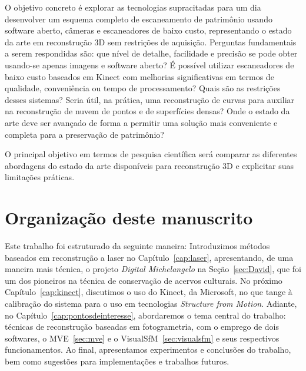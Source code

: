 O objetivo concreto é explorar as tecnologias supracitadas para
um dia desenvolver um esquema completo de escaneamento de patrimônio usando software aberto, câmeras e
escaneadores de baixo custo, representando o estado da arte em reconstrução 3D sem
restrições de aquisição. Perguntas fundamentais a serem respondidas são: que
nível de detalhe, facilidade e precisão se pode obter usando-se apenas imagens e software
aberto? É possível utilizar escaneadores de baixo custo baseados em Kinect com
melhorias significativas em termos de qualidade, conveniência ou tempo de
processamento?  Quais são as restrições desses sistemas? Seria útil, na prática,
uma reconstrução de curvas para auxiliar na reconstrução de nuvem de pontos e de
superfícies densas? Onde o estado da arte deve ser avançado de forma a permitir
uma solução mais conveniente e completa para a preservação de patrimônio?

O principal objetivo em termos de pesquisa científica será comparar as
diferentes abordagens do estado da arte disponíveis para reconstrução 3D e
explicitar suas limitações práticas.

\section{Organização deste manuscrito}

Este trabalho foi estruturado da seguinte maneira: Introduzimos
métodos baseados em reconstrução a laser no Capítulo~\ref{cap:laser},
apresentando, de uma maneira mais técnica, o projeto \emph{Digital
Michelangelo} na Seção~\ref{sec:David}, que foi um dos pioneiros na técnica de
conservação de acervos culturais. No próximo Capítulo~\ref{cap:kinect},
discutimos o uso do Kinect, da Microsoft, no que tange à calibração do sistema
para o uso em tecnologias \emph{Structure from Motion}.  Adiante, no
Capítulo~\ref{cap:pontosdeinteresse}, abordaremos o tema central do trabalho:
técnicas de reconstrução baseadas em fotogrametria, com o emprego de dois
softwares, o MVE~\ref{sec:mve} e o VisualSfM~\ref{sec:visualsfm} e seus
respectivos funcionamentos. Ao final, apresentamos experimentos e conclusões
do trabalho, bem como sugestões para implementações e trabalhos futuros.

